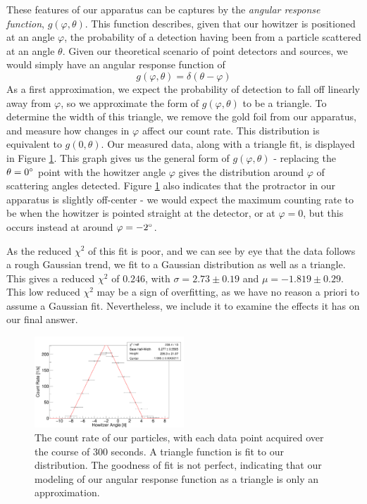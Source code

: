 These features of our apparatus can be captures by the \textit{angular response function}, $g(\varphi, \theta)$. This function describes, given that our howitzer is positioned at an angle $\varphi$, the probability of a detection having been from a particle scattered at an angle $\theta$. Given our theoretical scenario of point detectors and sources, we would simply have an angular response function of
\begin{equation}
  g(\varphi, \theta) = \delta(\theta - \varphi)
\end{equation}
As a first approximation, we expect the probability of detection to fall off linearly away from $\varphi$, so we approximate the form of $g(\varphi, \theta)$ to be a triangle. To determine the width of this triangle, we remove the gold foil from our apparatus, and measure how changes in $\varphi$ affect our count rate. This distribution is equivalent to $g(0, \theta)$. Our measured data, along with a triangle fit, is displayed in Figure \ref{profile}. This graph gives us the general form of $g(\varphi, \theta)$ - replacing the $\theta=0\degree$ point with the howitzer angle $\varphi$ gives the distribution around $\varphi$ of scattering angles detected. Figure \ref{profile} also indicates that the protractor in our apparatus is slightly off-center - we would expect the maximum counting rate to be when the howitzer is pointed straight at the detector, or at $\varphi = 0$\degree, but this occurs instead at around $\varphi = -2\degree$.

As the reduced $\chi^2$ of this fit is poor, and we can see by eye that the data follows a rough Gaussian trend, we fit to a Gaussian distribution as well as a triangle. This gives a reduced $\chi^2$ of $0.246$, with  $\sigma = 2.73 \pm 0.19$ and $\mu = -1.819 \pm 0.29$. This low reduced $\chi^2$ may be a sign of overfitting, as we have no reason a priori to assume a Gaussian fit. Nevertheless, we include it to examine the effects it has on our final answer.
\begin{figure}[h]
  \includegraphics[width=0.5\textwidth]{c1.png}
  \caption{The count rate of our particles, with each data point acquired over the course of 300 seconds. A triangle function is fit to our distribution. The goodness of fit is not perfect, indicating that our modeling of our angular response function as a triangle is only an approximation.}
  \label{profile}
\end{figure}

